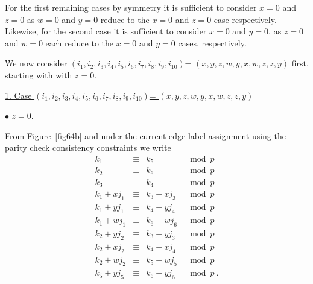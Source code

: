 For the first remaining cases by symmetry it is sufficient to
consider $x=0$ and $z=0$ as $w=0$ and $y=0$ reduce to the $x=0$
and $z=0$ case respectively. Likewise, for the second case it is
sufficient to consider $x=0$ and $y=0$, as $z=0$ and $w=0$ each
reduce to the $x=0$ and $y=0$ cases, respectively.





We now consider $(i_1,i_2,i_3,i_4,i_5,i_6,i_7,i_8,i_9,i_{10})$=
$(x,y,z,w,y,x,w,z,z,y)$ first, starting with with $z=0$. 

\underline{1. Case $(i_1,i_2,i_3,i_4,i_5,i_6,i_7,i_8,i_9,i_{10})$=
$(x,y,z,w,y,x,w,z,z,y)$}

$\bullet$ $z=0$.

 From Figure~\ref{fig64b} and under the current edge label
 assignment using the parity check consistency constraints we write
\begin{equation}\label{eq10a}\begin{array}{ccccc}
k_1 & \equiv &k_5 &\mod p\\
k_2 & \equiv &k_6 &\mod p\\
k_3 & \equiv &k_4 &\mod p\\
k_1+xj_1 & \equiv & k_3+xj_3 &\mod p\\
k_1+yj_1 & \equiv & k_4+yj_4 &\mod p\\
k_1+wj_1 & \equiv & k_6+wj_6 &\mod p\\
k_2+yj_2 & \equiv & k_3+yj_3 &\mod p\\
k_2+xj_2 & \equiv & k_4+xj_4 &\mod p\\
k_2+wj_2 & \equiv & k_5+wj_5 &\mod p\\
k_5+yj_5 & \equiv & k_6+yj_6 &\mod p~.
\end{array}\end{equation}

